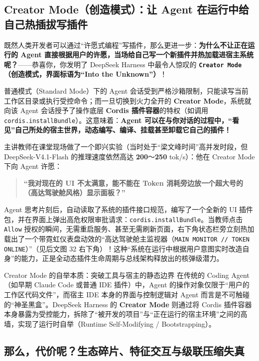 \documentclass[a4paper]{article}
\begin{document}
\subsection{Creator Mode（创造模式）：让 Agent 在运行中给自己热插拔写插件}

既然人类开发者可以通过“许愿式编程”写插件，那么更进一步：\textbf{为什么不让正在运行的 Agent 直接根据用户的许愿，当场给自己写一个新插件并热加载进宿主系统呢？}——恭喜你，你发明了 DeepSeek Harness 中最令人惊叹的 \textbf{\texttt{Creator Mode}（创造模式，界面标语为“Into the Unknown”）}！

普通模式（Standard Mode）下的 Agent 会话受到严格沙箱限制，只能读写当前工作区目录或执行受控命令；而一旦切换到火力全开的 \textbf{Creator Mode}，系统就向该 Agent 会话授予了操作底层 \textbf{Cordis 插件容器}的特权（如调用 \texttt{cordis.installBundle}）。这意味着：\textbf{Agent 可以在与你对话的过程中，“看见”自己所处的宿主世界，动态编写、编译、挂载甚至卸载它自己的插件！}

主讲教师在课堂现场做了一个即兴实验（当时处于“梁文峰时间”高并发时段，但 DeepSeek-V4.1-Flash 的推理速度依然高达 \textbf{200}～\textbf{250} tok/s）：他在 Creator Mode 下向 Agent 许愿：
\begin{quote}
\textbf{“我对现在的 UI 不太满意，能不能在 Token 消耗旁边放一个超大号的（高达驾驶舱风格）显示面板？”}
\end{quote}
Agent 思考片刻后，自动读取了系统的插件接口规范，编写了一个全新的 UI 插件包，并在界面上弹出高危权限审批请求：\texttt{cordis.installBundle}。当教师点击 \texttt{Allow} 授权的瞬间，无需重启服务、甚至无需刷新页面，右下角状态栏旁立刻热加载出了一个带霓虹仪表盘动效的“高达驾驶舱主监视器（\texttt{MAIN MONITOR // TOKEN ONLINE}）”（见后文图 32 右下角）！这种“系统在运行中根据用户意图实时改造自身”的能力，正是全动态插件生命周期与总线架构释放出的核弹级潜力。

\begin{importantbox}{Creator Mode 的自举本质：突破工具与宿主的静态边界}
在传统的 Coding Agent（如早期 Claude Code 或普通 IDE 插件）中，Agent 的操作对象仅限于“用户的工作区代码文件”，而宿主 IDE 本身的界面与控制逻辑对 Agent 而言是不可触碰的“神圣黑盒”。DeepSeek Harness 的 \textbf{Creator Mode} 则通过将 Cordis 插件容器本身暴露为受控能力，拆除了“被开发的项目”与“正在运行的宿主环境”之间的高墙，实现了运行时自举（Runtime Self-Modifying / Bootstrapping）。
\end{importantbox}

\subsection{那么，代价呢？生态碎片、特征交互与级联压缩失真}
\end{document}
